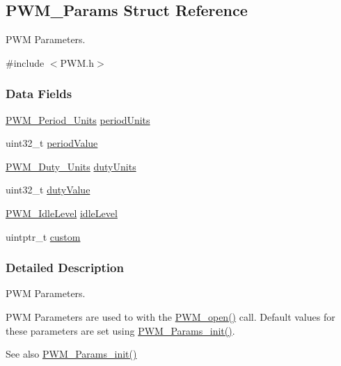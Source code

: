 \subsection{P\+W\+M\+\_\+\+Params Struct Reference}
\label{struct_p_w_m___params}


P\+W\+M Parameters.  




{\ttfamily \#include $<$P\+W\+M.\+h$>$}

\subsubsection*{Data Fields}
\begin{DoxyCompactItemize}
\item 
\hyperlink{_p_w_m_8h_a11aa442e82549992c98729216d64fd63}{P\+W\+M\+\_\+\+Period\+\_\+\+Units} \hyperlink{struct_p_w_m___params_a9b31d4a26ee33211085b5a9a983f6f9c}{period\+Units}
\item 
uint32\+\_\+t \hyperlink{struct_p_w_m___params_abb64879de715fcfa14e9c756f279b972}{period\+Value}
\item 
\hyperlink{_p_w_m_8h_abc7bc5565f2767cf9f06c1572044a8ee}{P\+W\+M\+\_\+\+Duty\+\_\+\+Units} \hyperlink{struct_p_w_m___params_aa8616ac3e487fe6b46fd0486c10873d3}{duty\+Units}
\item 
uint32\+\_\+t \hyperlink{struct_p_w_m___params_ad0ed6daabdc32e1eecfae60ebe13e975}{duty\+Value}
\item 
\hyperlink{_p_w_m_8h_a5a40c7014745d15b0c1a604dae5593f9}{P\+W\+M\+\_\+\+Idle\+Level} \hyperlink{struct_p_w_m___params_adc9d7e702b3e45b68e448ad4811a3691}{idle\+Level}
\item 
uintptr\+\_\+t \hyperlink{struct_p_w_m___params_aa0aeab9ee539a99c18e3208c87baf37a}{custom}
\end{DoxyCompactItemize}


\subsubsection{Detailed Description}
P\+W\+M Parameters. 

P\+W\+M Parameters are used to with the \hyperlink{_p_w_m_8h_ac963beab0c5c6901bf852f175028aeaf}{P\+W\+M\+\_\+open()} call. Default values for these parameters are set using \hyperlink{_p_w_m_8h_acbdd3192f9f06bf689e4a3855926dcac}{P\+W\+M\+\_\+\+Params\+\_\+init()}.

\begin{DoxySeeAlso}{See also}
\hyperlink{_p_w_m_8h_acbdd3192f9f06bf689e4a3855926dcac}{P\+W\+M\+\_\+\+Params\+\_\+init()} 
\end{DoxySeeAlso}


